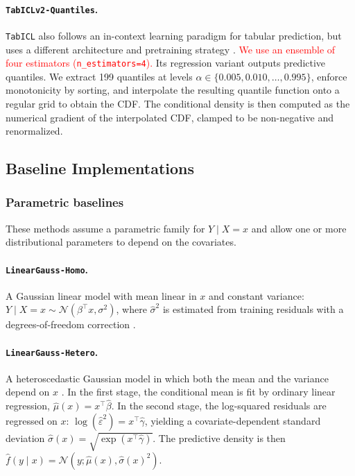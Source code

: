 \documentclass{article}
\newcommand{\method}[1]{\texttt{#1}}
\begin{document}
\paragraph{\method{TabICLv2-Quantiles}.}
\method{TabICL} also follows an in-context learning paradigm for tabular
prediction, but uses a different architecture and pretraining strategy
\citep{qu2025tabicl,qu2026tabiclv2}. \textcolor{red}{We use an ensemble of four estimators (\texttt{n\_estimators=4}).} Its
regression variant outputs predictive quantiles. We extract 199 quantiles at
levels $\alpha \in \{0.005, 0.010, \ldots, 0.995\}$, enforce monotonicity by
sorting, and interpolate the resulting quantile function onto a regular grid to
obtain the CDF. The conditional density is then computed as the numerical
gradient of the interpolated CDF, clamped to be non-negative and renormalized.

\subsection{Baseline Implementations}
\label{app:baseline_details}

\subsubsection{Parametric baselines}
\label{app:parametric_details}

These methods assume a parametric family for $Y\mid X=x$ and allow one or more
distributional parameters to depend on the covariates.

\paragraph{\method{LinearGauss-Homo}.}
A Gaussian linear model with mean linear in $x$ and constant variance:
$Y\mid X=x\sim\mathcal N(\beta^\top x,\sigma^2)$, where $\hat\sigma^2$ is
estimated from training residuals with a degrees-of-freedom correction
\citep{rigby2005generalized,kneib2023rage}.

\paragraph{\method{LinearGauss-Hetero}.}
A heteroscedastic Gaussian model in which both the mean and the variance depend
on $x$ \citep{rigby2005generalized,kneib2023rage}. In the first stage, the
conditional mean is fit by ordinary linear regression,
$\hat\mu(x)=x^\top\hat\beta$. In the second stage, the log-squared residuals are
regressed on $x$:
$\log(\hat\varepsilon^2)=x^\top\hat\gamma$, yielding a covariate-dependent
standard deviation
$\hat\sigma(x)=\sqrt{\exp(x^\top\hat\gamma)}$. The predictive density is then
$\hat f(y\mid x)=\mathcal N(y;\hat\mu(x),\hat\sigma(x)^2)$.
\end{document}
